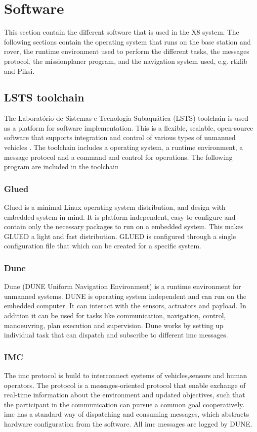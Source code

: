 \section{Software}\label{S:software}
This section contain the different software that is used in the X8 system. The following sections contain the operating system that runs on the base station and rover, the runtime environment used to perform the different tasks, the messages protocol, the missionplaner program, and the navigation system used, e.g. \gls{rtklib} and Piksi.
\subsection{LSTS toolchain}
The Laboratório de Sistemas e Tecnologia Subaquática (LSTS) toolchain is used as a platform for software implementation. This is a flexible, scalable, open-source software that supports integration and control of various types of unmanned vehicles \citep{pinto2013lsts}. The toolchain includes a operating system, a runtime environment, a message protocol and a command and control for operations. The following program are included in the toolchain
\subsubsection{Glued}
Glued is a minimal Linux operating system distribution, and design with embedded system in mind. It is platform independent, easy to configure and contain only the necessary packages to run on a embedded system. This makes GLUED a light and fast distribution. GLUED is configured through a single configuration file that which can be created for a specific system. 
\subsubsection{Dune}
Dune (DUNE Uniform Navigation Environment) is a runtime environment for unmanned systems. DUNE is operating system independent and can run on the embedded computer. It can interact with the sensors, actuators and payload. In addition it can be used for tasks like communication, navigation, control, manoeuvring, plan execution and supervision.
Dune works by setting up individual task that can dispatch and subscribe to different \gls{imc} messages.
\subsubsection{IMC}\label{ss:IMC}
The \acrfull{imc} protocol is build to interconnect systems of vehicles,sensors and human operators. The protocol is a messages-oriented protocol that enable exchange of real-time information about the environment and updated objectives, such that the participant in the communication can pursue a common goal cooperatively.
\gls{imc} has a standard way of dispatching and consuming messages, which abstracts hardware configuration from the software. All \gls{imc} messages are logged by DUNE.

